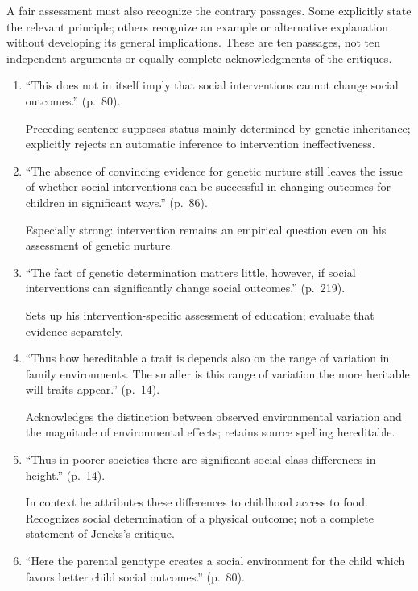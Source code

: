A fair assessment must also recognize the contrary passages. Some
explicitly state the relevant principle; others recognize an example or
alternative explanation without developing its general implications.
These are ten passages, not ten independent arguments or equally complete
acknowledgments of the critiques.

\begin{enumerate}[label=\arabic*.]
\item ``This does not in itself imply that social interventions cannot change social outcomes.'' (p.~80).

Preceding sentence supposes status mainly determined by genetic inheritance; explicitly rejects an automatic inference to intervention ineffectiveness.

\item ``The absence of convincing evidence for genetic nurture still leaves the issue of whether social interventions can be successful in changing outcomes for children in significant ways.'' (p.~86).

Especially strong: intervention remains an empirical question even on his assessment of genetic nurture.

\item ``The fact of genetic determination matters little, however, if social interventions can significantly change social outcomes.'' (p.~219).

Sets up his intervention-specific assessment of education; evaluate that evidence separately.

\item ``Thus how hereditable a trait is depends also on the range of variation in family environments. The smaller is this range of variation the more heritable will traits appear.'' (p.~14).

Acknowledges the distinction between observed environmental variation and the magnitude of environmental effects; retains source spelling hereditable.

\item ``Thus in poorer societies there are significant social class differences in height.'' (p.~14).

In context he attributes these differences to childhood access to food. Recognizes social determination of a physical outcome; not a complete statement of Jencks's critique.

\item ``Here the parental genotype creates a social environment for the child which favors better child social outcomes.'' (p.~80).


\end{enumerate}
